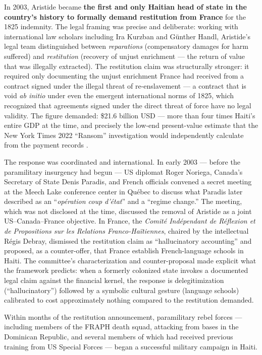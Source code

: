 In 2003, Aristide became \textbf{the first and only Haitian head of state in the country's history to formally demand restitution from France} for the 1825 indemnity. The legal framing was precise and deliberate: working with international law scholars including Ira Kurzban and G\"{u}nther Handl, Aristide's legal team distinguished between \textit{reparations} (compensatory damages for harm suffered) and \textit{restitution} (recovery of unjust enrichment --- the return of value that was illegally extracted). The restitution claim was structurally stronger: it required only documenting the unjust enrichment France had received from a contract signed under the illegal threat of re-enslavement --- a contract that is void \textit{ab initio} under even the emergent international norms of 1825, which recognized that agreements signed under the direct threat of force have no legal validity. The figure demanded: \$21.6 billion USD --- more than four times Haiti's entire GDP at the time, and precisely the low-end present-value estimate that the New York Times 2022 ``Ransom'' investigation would independently calculate from the payment records \cite{nyt_ransom2022}.

The response was coordinated and international. In early 2003 --- before the paramilitary insurgency had begun --- US diplomat Roger Noriega, Canada's Secretary of State Denis Paradis, and French officials convened a secret meeting at the Meech Lake conference center in Qu\'{e}bec to discuss what Paradis later described as an ``\textit{op\'{e}ration coup d'\'{e}tat}'' and a ``regime change.'' The meeting, which was not disclosed at the time, discussed the removal of Aristide as a joint US--Canada--France objective. In France, the \textit{Comit\'{e} Ind\'{e}pendant de R\'{e}flexion et de Propositions sur les Relations Franco-Ha\"itiennes}, chaired by the intellectual R\'{e}gis Debray, dismissed the restitution claim as ``hallucinatory accounting'' and proposed, as a counter-offer, that France establish French-language schools in Haiti. The committee's characterization and counter-proposal made explicit what the framework predicts: when a formerly colonized state invokes a documented legal claim against the financial kernel, the response is delegitimization (``hallucinatory'') followed by a symbolic cultural gesture (language schools) calibrated to cost approximately nothing compared to the restitution demanded.

Within months of the restitution announcement, paramilitary rebel forces --- including members of the FRAPH death squad, attacking from bases in the Dominican Republic, and several members of which had received previous training from US Special Forces --- began a successful military campaign in Haiti.

